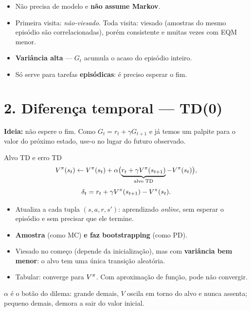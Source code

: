 \documentclass[11pt, a4paper]{article}
\begin{document}
\begin{itemize}
  \item Não precisa de modelo e \textbf{não assume Markov}.
  \item Primeira visita: \emph{não-viesado}. Toda visita: viesado
        (amostras do mesmo episódio são correlacionadas), porém consistente
        e muitas vezes com EQM menor.
  \item \textbf{Variância alta} — $G_t$ acumula o acaso do episódio inteiro.
  \item Só serve para tarefas \textbf{episódicas}: é preciso esperar o fim.
\end{itemize}

\section{2. Diferença temporal — TD(0)}

\textbf{Ideia:} não espere o fim. Como $G_t = r_t + \gamma G_{t+1}$ e já temos
um palpite para o valor do próximo estado, use-o no lugar do futuro observado.

\begin{defbox}{Alvo TD e erro TD}
  \vspace{-1.1em}
  \[
    V^{\pi}(s_t) \leftarrow V^{\pi}(s_t) + \alpha\bigl(
      \underbrace{r_t + \gamma V^{\pi}(s_{t+1})}_{\text{alvo TD}} - V^{\pi}(s_t)\bigr),
  \]
  \vspace{-1.3em}
  \[
    \delta_t = r_t + \gamma V^{\pi}(s_{t+1}) - V^{\pi}(s_t).
  \]
\end{defbox}

\begin{itemize}
  \item Atualiza a cada tupla $(s,a,r,s')$: aprendizado \emph{online},
        sem esperar o episódio e sem precisar que ele termine.
  \item \textbf{Amostra} (como MC) \textbf{e faz bootstrapping} (como PD).
  \item Viesado no começo (depende da inicialização), mas com
        \textbf{variância bem menor}: o alvo tem uma única transição aleatória.
  \item Tabular: converge para $V^{\pi}$. Com aproximação de função, pode não convergir.
\end{itemize}

\begin{alertabox}
  $\alpha$ é o botão do dilema: grande demais, $V$ oscila em torno do alvo e
  nunca assenta; pequeno demais, demora a sair do valor inicial.
\end{alertabox}
\end{document}
